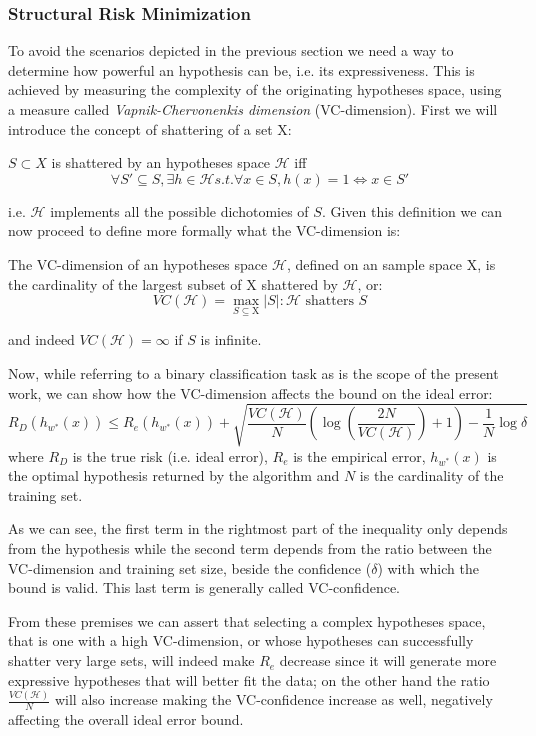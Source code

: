 \subsubsection{Structural Risk Minimization}
\label{subsubsec:srm}
To avoid the scenarios depicted in the previous section we need a way to determine
how powerful an hypothesis can be, i.e. its expressiveness.
This is achieved by measuring the complexity of the originating hypotheses space,
using a measure called \emph{Vapnik-Chervonenkis dimension} (VC-dimension).
First we will introduce the concept of shattering of a set $\mathrm{X}$:
\begin{definition}[Shattering]
    $S \subset X$ is shattered by an hypotheses space $\mathcal{H}$ iff
    \[\forall S' \subseteq S, \exists h \in \mathcal{H} s.t. \forall x \in S, h(x)=1 \iff x \in S'\]
\end{definition}
i.e. $\mathcal{H}$ implements all the possible dichotomies of $S$.
Given this definition we can now proceed to define more formally what the
VC-dimension is:
\begin{definition}[VC-dimension]
    The VC-dimension of an hypotheses space $\mathcal{H}$, defined on an sample
    space $\mathrm{X}$, is the cardinality of the largest subset of $\mathrm{X}$
    shattered by $\mathcal{H}$, or:
    \[VC(\mathcal{H}) = \max_{S\subseteq \mathrm{X}} |S| : \mathcal{H}\text{ shatters }S\]
\end{definition}
and indeed $VC(\mathcal{H})=\infty$ if $S$ is infinite.

Now, while referring to a binary classification task as is the scope of the present
work, we can show how the VC-dimension affects the bound on the ideal error:
\begin{displaymath}
    R_D(h_{w^*}(x)) \leq R_e(h_{w^*}(x)) + \sqrt{\frac{VC(\mathcal{H})}{N}
    (\log{(\frac{2N}{VC(\mathcal{H})})}+1) - \frac{1}{N}\log{\delta}}
\end{displaymath}
where $R_D$ is the true risk (i.e. ideal error), $R_e$ is the empirical error,
$h_{w^*}(x)$ is the optimal hypothesis returned by the algorithm and $N$ is the
cardinality of the training set.

As we can see, the first term in the rightmost part of the inequality only 
depends from the hypothesis while the second term depends from the ratio
between the VC-dimension and training set size, beside the confidence ($\delta$)
with which the bound is valid.
This last term is generally called VC-confidence.

From these premises we can assert that selecting a complex hypotheses space,
that is one with a high VC-dimension, or whose hypotheses can successfully shatter
very large sets, will indeed make $R_e$ decrease since it will generate more
expressive hypotheses that will better fit the data; on the other hand the ratio
$\frac{VC(\mathcal{H})}{N}$ will also increase making the VC-confidence increase
as well, negatively affecting the overall ideal error bound.

